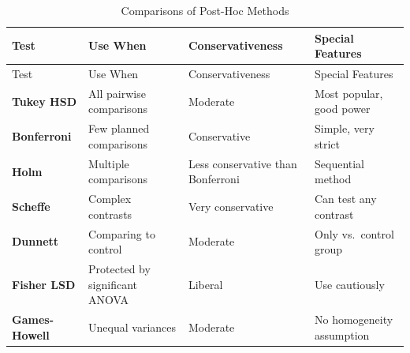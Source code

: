 \documentclass[
]{book}
\begin{document}
\begin{longtable}[]{@{}
  >{\raggedright\arraybackslash}p{}
  >{\raggedright\arraybackslash}p{}
  >{\raggedright\arraybackslash}p{}
  >{\raggedright\arraybackslash}p{}@{}}
\caption{\label{tab:post-hoc-test} Comparisons of Post-Hoc Methods}\tabularnewline
\toprule\noalign{}
\begin{minipage}[b]{\linewidth}\raggedright
Test
\end{minipage} & \begin{minipage}[b]{\linewidth}\raggedright
Use When
\end{minipage} & \begin{minipage}[b]{\linewidth}\raggedright
Conservativeness
\end{minipage} & \begin{minipage}[b]{\linewidth}\raggedright
Special Features
\end{minipage} \\
\midrule\noalign{}
\endfirsthead
\toprule\noalign{}
\begin{minipage}[b]{\linewidth}\raggedright
Test
\end{minipage} & \begin{minipage}[b]{\linewidth}\raggedright
Use When
\end{minipage} & \begin{minipage}[b]{\linewidth}\raggedright
Conservativeness
\end{minipage} & \begin{minipage}[b]{\linewidth}\raggedright
Special Features
\end{minipage} \\
\midrule\noalign{}
\endhead
\bottomrule\noalign{}
\endlastfoot
\textbf{Tukey HSD} & All pairwise comparisons & Moderate & Most popular, good power \\
\textbf{Bonferroni} & Few planned comparisons & Conservative & Simple, very strict \\
\textbf{Holm} & Multiple comparisons & Less conservative than Bonferroni & Sequential method \\
\textbf{Scheffe} & Complex contrasts & Very conservative & Can test any contrast \\
\textbf{Dunnett} & Comparing to control & Moderate & Only vs.~control group \\
\textbf{Fisher LSD} & Protected by significant ANOVA & Liberal & Use cautiously \\
\textbf{Games-Howell} & Unequal variances & Moderate & No homogeneity assumption \\
\end{longtable}
\end{document}
